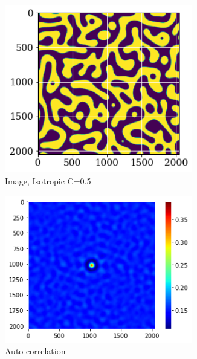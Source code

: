 \documentclass[12pt, a4paper]{report}
\begin{document}
\begin{figure}[H]
\centering
\begin{subfigure}{.32\textwidth}
  \centering
  \includegraphics[width=0.9\textwidth]{Pictures/MSFeatures/CorrIsoImage.png}
  \caption{Image, Isotropic C=0.5}
  \label{img:microstrImg}
\end{subfigure}
\begin{subfigure}{.32\textwidth}
  \centering
  \includegraphics[width=0.9\textwidth]{Pictures/MSFeatures/CorrImageAuto.png}
  \caption{Auto-correlation}
  \label{img:microstrImg}
\end{subfigure}
\begin{subfigure}{.32\textwidth}

\end{subfigure}
\end{figure}
\end{document}
